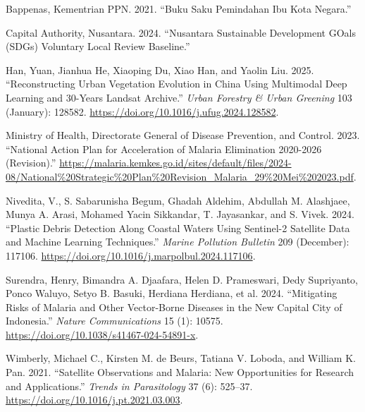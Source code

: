 \documentclass[
  letterpaper,
  DIV=11,
  numbers=noendperiod]{scrreprt}
\newlength{\cslhangindent}
\newlength{\cslentryspacingunit} %
\newenvironment{CSLReferences}[2] %
 {%
  \setlength{\parindent}{0pt}
  \ifodd #1
  \let\oldpar\par
  \def\par{\hangindent=\cslhangindent\oldpar}
  \fi
  \setlength{\parskip}{#2\cslentryspacingunit}
 }%
 {}
\begin{document}
\hypertarget{refs}{}
\begin{CSLReferences}{1}{0}
\leavevmode{}%
Bappenas, Kementrian PPN. 2021. {``Buku Saku Pemindahan Ibu Kota
Negara.''}

\leavevmode{}%
Capital Authority, Nusantara. 2024. {``Nusantara Sustainable Development
GOals (SDGs) Voluntary Local Review Baseline.''}

\leavevmode{}%
Han, Yuan, Jianhua He, Xiaoping Du, Xiao Han, and Yaolin Liu. 2025.
{``Reconstructing Urban Vegetation Evolution in China Using Multimodal
Deep Learning and 30-Years Landsat Archive.''} \emph{Urban Forestry \&
Urban Greening} 103 (January): 128582.
\url{https://doi.org/10.1016/j.ufug.2024.128582}.

\leavevmode{}%
Ministry of Health, Directorate General of Disease Prevention, and
Control. 2023. {``National Action Plan for Acceleration of Malaria
Elimination 2020-2026 (Revision).''}
\url{https://malaria.kemkes.go.id/sites/default/files/2024-08/National\%20Strategic\%20Plan\%20Revision_Malaria_29\%20Mei\%202023.pdf}.

\leavevmode{}%
Nivedita, V., S. Sabarunisha Begum, Ghadah Aldehim, Abdullah M.
Alashjaee, Munya A. Arasi, Mohamed Yacin Sikkandar, T. Jayasankar, and
S. Vivek. 2024. {``Plastic Debris Detection Along Coastal Waters Using
Sentinel-2 Satellite Data and Machine Learning Techniques.''}
\emph{Marine Pollution Bulletin} 209 (December): 117106.
\url{https://doi.org/10.1016/j.marpolbul.2024.117106}.

\leavevmode{}%
Surendra, Henry, Bimandra A. Djaafara, Helen D. Prameswari, Dedy
Supriyanto, Ponco Waluyo, Setyo B. Basuki, Herdiana Herdiana, et al.
2024. {``Mitigating Risks of Malaria and Other Vector-Borne Diseases in
the New Capital City of Indonesia.''} \emph{Nature Communications} 15
(1): 10575. \url{https://doi.org/10.1038/s41467-024-54891-x}.

\leavevmode{}%
Wimberly, Michael C., Kirsten M. de Beurs, Tatiana V. Loboda, and
William K. Pan. 2021. {``Satellite Observations and Malaria: New
Opportunities for Research and Applications.''} \emph{Trends in
Parasitology} 37 (6): 525--37.
\url{https://doi.org/10.1016/j.pt.2021.03.003}.

\end{CSLReferences}
\end{document}
